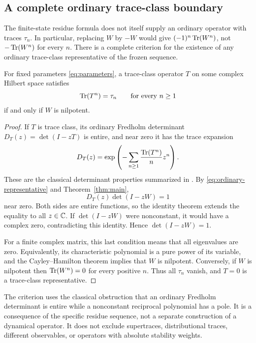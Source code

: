 \subsection{A complete ordinary trace-class boundary}

The finite-state residue formula does not itself supply an ordinary
operator with traces $\tau_n$. In particular, replacing $W$ by $-W$
would give $(-1)^n\operatorname{Tr}(W^n)$, not $-\operatorname{Tr}(W^n)$ for every $n$.
There is a complete criterion for the existence of any ordinary
trace-class representative of the frozen sequence.

\begin{proposition}\label{prop:trace-class}
For fixed parameters \eqref{eq:parameters}, a trace-class operator
$T$ on some complex Hilbert space satisfies
\begin{equation}\label{eq:ordinary-representative}
 \operatorname{Tr}(T^n)=\tau_n\qquad\text{for every }n\ge1
\end{equation}
if and only if $W$ is nilpotent.
\end{proposition}

\begin{proof}
If $T$ is trace class, its ordinary Fredholm determinant
$D_T(z)=\det(I-zT)$ is entire, and near zero it has the
trace expansion
\[
 D_T(z)=\exp\left(-\sum_{n\ge1}\frac{\operatorname{Tr}(T^n)}n z^n\right).
\]
These are the classical determinant properties summarized in
\citet[Sec.~3, in particular Eq.~(3.3) of the author manuscript]{bornemann2010fredholm}.
By \eqref{eq:ordinary-representative} and Theorem~\ref{thm:main},
\[
 D_T(z)\det(I-zW)=1
\]
near zero. Both sides are entire functions, so the identity theorem
extends the equality to all $z\in\mathbb C$. If $\det(I-zW)$ were
nonconstant, it would have a complex zero, contradicting this
identity. Hence $\det(I-zW)=1$.

For a finite complex matrix, this last condition means that all
eigenvalues are zero. Equivalently, its characteristic polynomial
is a pure power of its variable, and the Cayley--Hamilton theorem
implies that $W$ is nilpotent. Conversely, if $W$ is nilpotent then
$\operatorname{Tr}(W^n)=0$ for every positive $n$. Thus all $\tau_n$ vanish,
and $T=0$ is a trace-class representative.
\end{proof}

The criterion uses the classical obstruction that an ordinary
Fredholm determinant is entire while a nonconstant reciprocal
polynomial has a pole. It is a consequence of the specific residue
sequence, not a separate construction of a dynamical operator.
It does not exclude supertraces, distributional traces, different
observables, or operators with absolute stability weights.
